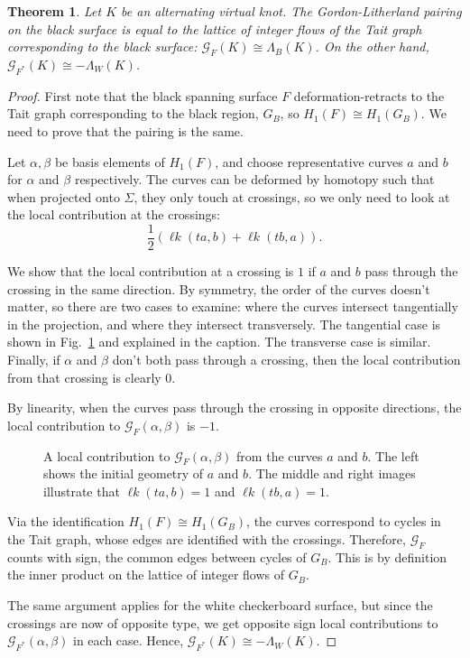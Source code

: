 \documentclass[12pt]{report}
\newcommand{\lk}{\operatorname{\ell\textit{k}}}
\newtheorem*{theorem}{Theorem}
\theoremstyle{upright}
\begin{document}
\begin{theorem}
Let $K$ be an alternating virtual knot. The Gordon-Litherland pairing on the black surface  is equal to the lattice of integer flows of the Tait graph corresponding to the black surface: $\mathcal{G}_{F}(K) \cong \Lambda_{B}(K)$. On the other hand, $\mathcal{G}_{F^{*}}(K) \cong -\Lambda_{W}(K)$.
\end{theorem}

\begin{proof}
First note that the black spanning surface $F$ deformation-retracts to the Tait graph corresponding to the black region, $G_{B}$, so $H_{1}(F) \cong H_{1}(G_{B})$. We need to prove that the pairing is the same.

Let $\alpha, \beta$ be basis elements of $H_{1}(F)$, and choose representative curves $a$ and $b$ for $\alpha$ and $\beta$ respectively. The curves can be deformed by homotopy such that when projected onto $\Sigma$, they only touch at crossings, so we only need to look at the local contribution at the crossings:
\[\dfrac{1}{2} \left( \lk(t a, b) + \lk(t b, a) \right).\]

We show that the local contribution at a crossing is $1$ if $a$ and $b$ pass through the crossing in the same direction. By symmetry, the order of the curves doesn't matter, so there are two cases to examine: where the curves intersect tangentially in the projection, and where they intersect transversely. The tangential case is shown in Fig.~\ref{fig:gordon-litherland-pairing-example} and explained in the caption. The transverse case is similar. Finally, if $\alpha$ and $\beta$ don't both pass through a crossing, then the local contribution from that crossing is clearly 0.

By linearity, when the curves pass through the crossing in opposite directions, the local contribution to $\mathcal{G}_{F}(\alpha, \beta)$ is $-1$.

\begin{figure}[h!]
	\centering
	\def\svgscale{0.54}
	
	
	\caption{A local contribution to $\mathcal{G}_{F}(\alpha, \beta)$ from the curves $a$ and $b$. The left shows the initial geometry of $a$ and $b$. The middle and right images illustrate that $\lk(ta, b) = 1$ and $\lk(tb, a) = 1$.}
	\label{fig:gordon-litherland-pairing-example}
\end{figure}

Via the identification $H_{1}(F) \cong H_{1}(G_{B})$, the curves correspond to cycles in the Tait graph, whose edges are identified with the crossings. Therefore, $\mathcal{G}_{F}$ counts with sign, the common edges between cycles of $G_{B}$. This is by definition the inner product on the lattice of integer flows of $G_{B}$.

The same argument applies for the white checkerboard surface, but since the crossings are now of opposite type, we get opposite sign local contributions to $\mathcal{G}_{F^{*}}(\alpha, \beta)$ in each case. Hence, $\mathcal{G}_{F^{*}}(K) \cong -\Lambda_{W}(K)$.
\end{proof}
\end{document}
